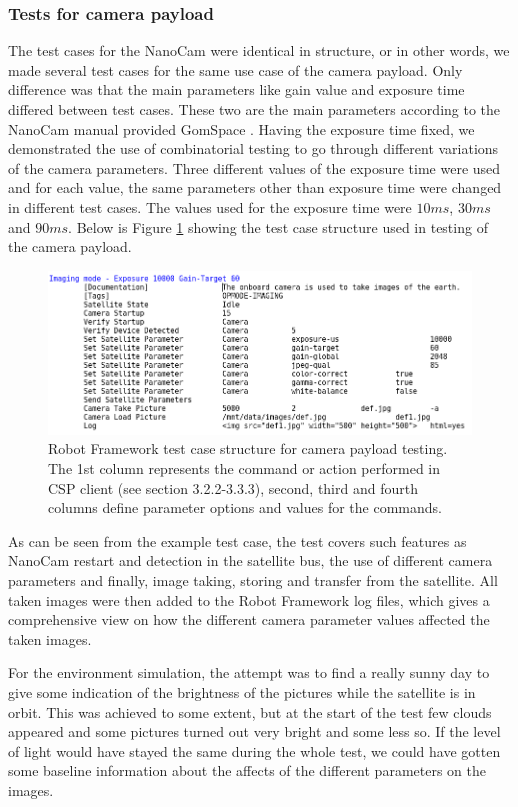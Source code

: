 \documentclass[english,12pt,a4paper,pdftex,elec,utf8]{aaltothesis}
\begin{document}
\subsubsection{Tests for camera payload}
The test cases for the NanoCam were identical in structure, or in other words, we made several test cases for the same use case of the camera payload. Only difference was that the main parameters like gain value and exposure time differed between test cases. These two are the main parameters according to the NanoCam manual provided GomSpace \cite{nanocamds}. Having the exposure time fixed, we demonstrated the use of combinatorial testing to go through different variations of the camera parameters. Three different values of the exposure time were used and for each value, the same parameters other than exposure time were changed in different test cases. The values used for the exposure time were ${10 ms}$, ${30 ms}$ and ${90 ms}$.  Below is Figure \ref{robotcamera} showing the test case structure used in testing of the camera payload.\par
\begin{figure}[h!]
\centering
\includegraphics[scale=0.5]{cameracase}
\caption{Robot Framework test case structure for camera payload testing. The 1st column represents the command or action performed in CSP client (see section 3.2.2-3.3.3), second, third and fourth columns define parameter options and values for the commands.}
\label{robotcamera}
\end{figure}
As can be seen from the example test case, the test covers such features as NanoCam restart and detection in the satellite bus, the use of different camera parameters and finally, image taking, storing and transfer from the satellite. All taken images were then added to the Robot Framework log files, which gives a comprehensive view on how the different camera parameter values affected the taken images.\par 
For the environment simulation, the attempt was to find a really sunny day to give some indication of the brightness of the pictures while the satellite is in orbit. This was achieved to some extent, but at the start of the test few clouds appeared and some pictures turned out very bright and some less so. If the level of light would have stayed the same during the whole test, we could have gotten some baseline information about the affects of the different parameters on the images.\par
\end{document}
